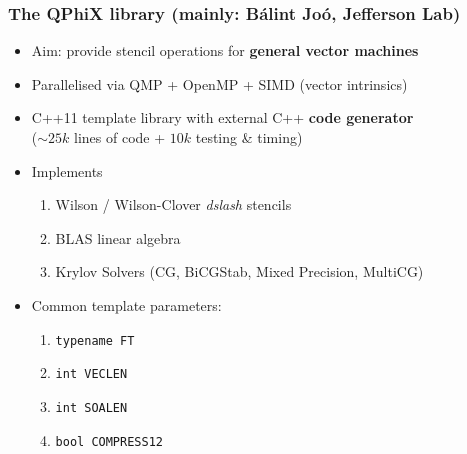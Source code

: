 \documentclass{beamer}
\begin{document}

  \begin{frame}
    \frametitle{The QPhiX library (mainly: Bálint Joó, Jefferson Lab)}

    \begin{itemize}
      \item Aim: provide stencil operations for \textbf{general vector machines}
        \vfill
      \item Parallelised via QMP + OpenMP + SIMD (vector intrinsics)
        \vfill
      \item C++11 template library with external C++ \textbf{code generator}\\
        ($\sim25k$ lines of code + $10k$ testing \& timing)
        \vfill
      \item Implements
        \begin{enumerate}
          \item Wilson / Wilson-Clover \textit{dslash} stencils
          \item BLAS linear algebra
          \item Krylov Solvers (CG, BiCGStab, Mixed Precision, MultiCG)
        \end{enumerate}
        \vfill
      \item Common template parameters:
        \begin{enumerate}
          \item \texttt{typename FT}
          \item \texttt{int VECLEN}
          \item \texttt{int SOALEN}
          \item \texttt{bool COMPRESS12}
        \end{enumerate}
        \vfill
    \end{itemize}

  \end{frame}

\end{document}
